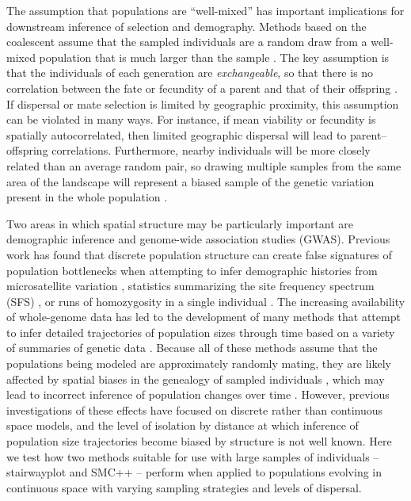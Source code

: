 \documentclass[10pt,twoside,lineno,hidelinks]{preprint} %
\begin{document}
The assumption that populations are ``well-mixed'' has important implications for downstream inference of selection and demography. Methods based on the coalescent \citep{Kingman1982,wakeley2005coalescent} assume that the sampled individuals are a random draw from a well-mixed population
that is much larger than the sample \citep{wakeley2003gene}. The key assumption is that the individuals of each generation are \emph{exchangeable}, so that there is no correlation between the fate or fecundity of a parent and that of their offspring \citep{Huillet2011}. If dispersal or mate selection is limited by geographic proximity, this assumption can be violated in many ways. For instance, if mean viability or fecundity is spatially autocorrelated, then limited geographic dispersal will lead to parent--offspring correlations. Furthermore, nearby individuals will be more closely related than an average random pair, so drawing multiple samples from the same area of the landscape will represent a biased sample of the genetic variation present in the whole population \citep{Stadler2009}.%

Two areas in which spatial structure may be particularly important are demographic inference and genome-wide association studies (GWAS). Previous work has found that discrete population structure can create false signatures of population bottlenecks when attempting to infer demographic histories from microsatellite variation \citep{Chikhi2010}, statistics summarizing the site frequency spectrum (SFS) \citep{Ptak2002,Stadler2009,Onge2012}, or runs of homozygosity in a single individual \citep{Mazet2015}. The increasing availability of whole-genome data has led to the development of many methods that attempt to infer detailed trajectories of population sizes through time based on a variety of summaries of genetic data \citep{Liu2015,Schiffels2014,Sheehan2013,Terhorst2016}. 
Because all of these methods assume that the populations being modeled are approximately randomly mating, they are likely affected by spatial biases in the genealogy of sampled individuals \citep{Wakeley1999}, which may lead to incorrect inference of population changes over time \citep{Mazet2015}. However, previous investigations of these effects have focused on discrete rather than continuous space models, and the level of isolation by distance at which inference of population size trajectories become biased by structure is not well known. Here we test how two methods suitable for use with large samples of individuals -- stairwayplot \citep{Liu2015} and SMC++ \citep{Terhorst2016} -- perform when applied to populations evolving in continuous space with varying sampling strategies and levels of dispersal.  
\end{document}
